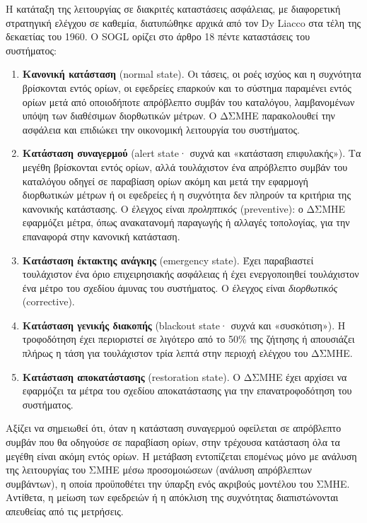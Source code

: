 Η κατάταξη της λειτουργίας σε διακριτές καταστάσεις ασφάλειας, με διαφορετική στρατηγική
ελέγχου σε καθεμία, διατυπώθηκε αρχικά από τον Dy Liacco στα τέλη της δεκαετίας του 1960. Ο SOGL
ορίζει στο άρθρο 18 πέντε καταστάσεις του συστήματος:

\begin{enumerate}
\item \textbf{Κανονική κατάσταση} (normal state). Οι τάσεις, οι ροές ισχύος και η συχνότητα
      βρίσκονται εντός ορίων, οι εφεδρείες επαρκούν και το σύστημα παραμένει εντός ορίων μετά
      από οποιοδήποτε απρόβλεπτο συμβάν του καταλόγου, λαμβανομένων
      υπόψη των διαθέσιμων διορθωτικών μέτρων. Ο ΔΣΜΗΕ παρακολουθεί την ασφάλεια και επιδιώκει την
      οικονομική λειτουργία του συστήματος.
\item \textbf{Κατάσταση συναγερμού} (alert state· συχνά και «κατάσταση επιφυλακής»). Τα
      μεγέθη βρίσκονται εντός ορίων, αλλά τουλάχιστον ένα απρόβλεπτο συμβάν του καταλόγου
      οδηγεί σε παραβίαση ορίων ακόμη και μετά την εφαρμογή διορθωτικών μέτρων ή οι εφεδρείες
      ή η συχνότητα δεν πληρούν τα κριτήρια της κανονικής κατάστασης. Ο έλεγχος είναι
      \emph{προληπτικός} (preventive): ο ΔΣΜΗΕ εφαρμόζει μέτρα, όπως ανακατανομή παραγωγής ή
      αλλαγές τοπολογίας, για την επαναφορά στην κανονική κατάσταση.
\item \textbf{Κατάσταση έκτακτης ανάγκης} (emergency state). Έχει παραβιαστεί τουλάχιστον
      ένα όριο επιχειρησιακής ασφάλειας ή έχει ενεργοποιηθεί τουλάχιστον ένα μέτρο του
      σχεδίου άμυνας του συστήματος. Ο έλεγχος είναι \emph{διορθωτικός} (corrective).
\item \textbf{Κατάσταση γενικής διακοπής} (blackout state· συχνά και «συσκότιση»). Η τροφοδότηση έχει περιοριστεί σε λιγότερο από το 50\% της ζήτησης ή απουσιάζει πλήρως η τάση για
      τουλάχιστον τρία λεπτά στην περιοχή ελέγχου του ΔΣΜΗΕ.
\item \textbf{Κατάσταση αποκατάστασης} (restoration state). Ο ΔΣΜΗΕ έχει αρχίσει να
      εφαρμόζει τα μέτρα του σχεδίου αποκατάστασης για την επανατροφοδότηση του
      συστήματος.
\end{enumerate}

Αξίζει να σημειωθεί ότι, όταν η κατάσταση συναγερμού οφείλεται σε απρόβλεπτο συμβάν που θα
οδηγούσε σε παραβίαση ορίων, στην τρέχουσα κατάσταση όλα τα μεγέθη είναι ακόμη εντός ορίων. Η
μετάβαση εντοπίζεται επομένως μόνο με ανάλυση της λειτουργίας του ΣΜΗΕ μέσω προσομοιώσεων
(ανάλυση απρόβλεπτων συμβάντων), η οποία προϋποθέτει την ύπαρξη ενός ακριβούς μοντέλου του ΣΜΗΕ. Αντίθετα, η μείωση των εφεδρειών ή η απόκλιση της
συχνότητας διαπιστώνονται απευθείας από τις μετρήσεις.

